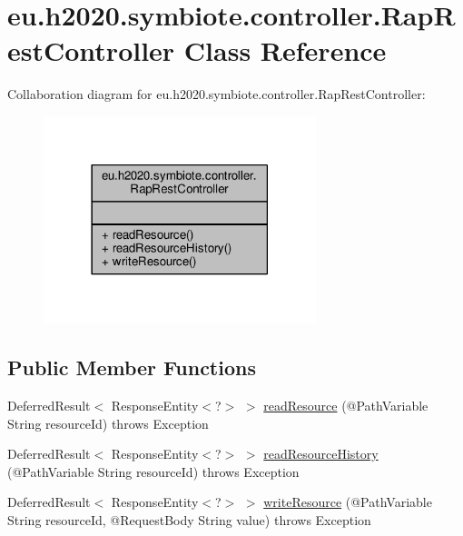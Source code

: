\hypertarget{classeu_1_1h2020_1_1symbiote_1_1controller_1_1RapRestController}{}\section{eu.\+h2020.\+symbiote.\+controller.\+Rap\+Rest\+Controller Class Reference}
\label{classeu_1_1h2020_1_1symbiote_1_1controller_1_1RapRestController}


Collaboration diagram for eu.\+h2020.\+symbiote.\+controller.\+Rap\+Rest\+Controller\+:
\nopagebreak
\begin{figure}[H]
\begin{center}
\leavevmode
\includegraphics[width=225pt]{classeu_1_1h2020_1_1symbiote_1_1controller_1_1RapRestController__coll__graph}
\end{center}
\end{figure}
\subsection*{Public Member Functions}
\begin{DoxyCompactItemize}
\item 
Deferred\+Result$<$ Response\+Entity$<$?$>$ $>$ \hyperlink{classeu_1_1h2020_1_1symbiote_1_1controller_1_1RapRestController_a02b5cac53d1bb33fb9e89cfc705511f4}{read\+Resource} (@Path\+Variable String resource\+Id)  throws Exception 
\item 
Deferred\+Result$<$ Response\+Entity$<$?$>$ $>$ \hyperlink{classeu_1_1h2020_1_1symbiote_1_1controller_1_1RapRestController_a11fc8b8068e57e32a81b1d3c835cded4}{read\+Resource\+History} (@Path\+Variable String resource\+Id)  throws Exception 
\item 
Deferred\+Result$<$ Response\+Entity$<$?$>$ $>$ \hyperlink{classeu_1_1h2020_1_1symbiote_1_1controller_1_1RapRestController_a2880be887baef0ec6a60627f7c9dc927}{write\+Resource} (@Path\+Variable String resource\+Id, @Request\+Body String value)  throws Exception 
\end{DoxyCompactItemize}


